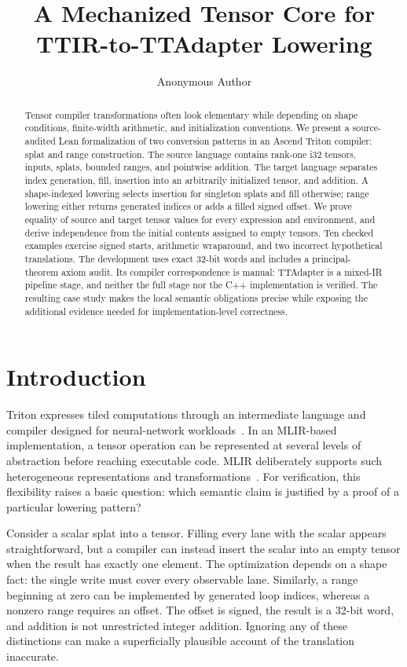 \documentclass[a4paper,USenglish,anonymous]{lipics-v2021}
\title{A Mechanized Tensor Core for TTIR-to-TTAdapter Lowering}
\author{Anonymous Author}{}{}{}{}
\begin{document}
\maketitle
\begin{abstract}
Tensor compiler transformations often look elementary while depending on shape
conditions, finite-width arithmetic, and initialization conventions. We present
a source-audited Lean formalization of two conversion patterns in an Ascend
Triton compiler: splat and range construction. The source language contains
rank-one i32 tensors, inputs, splats, bounded ranges, and pointwise addition.
The target language separates index generation, fill, insertion into an
arbitrarily initialized tensor, and addition. A shape-indexed lowering selects
insertion for singleton splats and fill otherwise; range lowering either
returns generated indices or adds a filled signed offset. We prove equality
of source and target tensor values for every expression and environment, and
derive independence from the initial contents assigned to empty tensors.
Ten checked examples exercise signed starts, arithmetic wraparound, and two
incorrect hypothetical translations. The development uses exact 32-bit words
and includes a principal-theorem axiom audit. Its compiler correspondence is
manual: TTAdapter is a mixed-IR pipeline stage, and neither the full stage nor
the C++ implementation is verified. The resulting case study makes the
local semantic obligations precise while exposing the additional evidence
needed for implementation-level correctness.
\end{abstract}

\section{Introduction}
Triton expresses tiled computations through an intermediate language and
compiler designed for neural-network workloads~\cite{triton}. In an
MLIR-based implementation, a tensor operation can be represented at several
levels of abstraction before reaching executable code. MLIR deliberately
supports such heterogeneous representations and transformations~\cite{mlir}.
For verification, this flexibility raises a basic question: which semantic
claim is justified by a proof of a particular lowering pattern?

Consider a scalar splat into a tensor. Filling every lane with the scalar
appears straightforward, but a compiler can instead insert the scalar into
an empty tensor when the result has exactly one element. The optimization
depends on a shape fact: the single write must cover every observable lane.
Similarly, a range beginning at zero can be implemented by generated loop
indices, whereas a nonzero range requires an offset. The offset is signed,
the result is a 32-bit word, and addition is not unrestricted integer
addition. Ignoring any of these distinctions can make a superficially
plausible account of the translation inaccurate.
\end{document}

